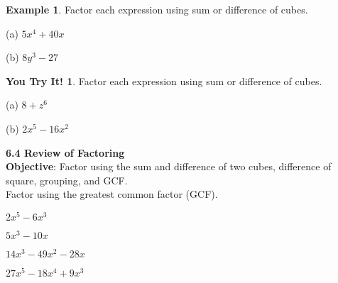 \documentclass{report}
\theoremstyle{definition}
\newtheorem{example}{\bf Example}
\newtheorem{youtry}{\bf You Try It!}
\begin{document}
\begin{example}
Factor each expression using sum or difference of cubes.
\end{example}

\begin{minipage}[t]{0.45\linewidth}
 (a) $5x^4+40x$
\end{minipage}
\begin{minipage}[t]{0.45\linewidth}
 (b) $8y^3-27$
\end{minipage}
\vfill

\begin{youtry}
Factor each expression using sum or difference of cubes.
\end{youtry}

\begin{minipage}[t]{0.45\linewidth}
 (a) $8+z^6$
\end{minipage}
\begin{minipage}[t]{0.45\linewidth}
 (b) $2x^5-16x^2$
\end{minipage}
\vfill



\vfill
 \noindent{}
 \newpage
\noindent\Large{\textbf{6.4 Review of Factoring}} \\

\indent\hfill\small\noindent \textbf{Objective}: Factor using the sum and difference of two cubes, difference of square, grouping, and GCF.  \large\\

\noindent Factor using the greatest common factor (GCF).\\

\begin{enumerate}
	\begin{minipage}[t]{0.45\linewidth}
	\item $2x^5-6x^3$ \\
	
	\vspace{2cm}
	\item $5x^3-10x$\\
	
	\vspace{2cm}
	\end{minipage}
	\hfill
	\begin{minipage}[t]{0.45\linewidth}
	\item $14x^3-49x^2-28x$\\
	
	\vspace{2cm}
	\item $27x^5-18x^4+9x^3$\\
	
	\vspace{2cm}
	\end{minipage}
\end{enumerate}
\end{document}
